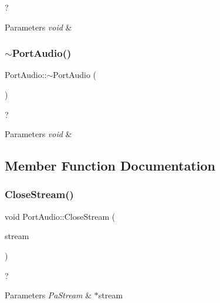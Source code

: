 ? 


\begin{DoxyParams}{Parameters}
{\em void} & \\
\hline
\end{DoxyParams}
\mbox{\label{class_port_audio_a5f80fdff2377981fcd42fae42d4b65c3}} 
\subsubsection{\texorpdfstring{$\sim$\+Port\+Audio()}{~PortAudio()}}
{\footnotesize\ttfamily Port\+Audio\+::$\sim$\+Port\+Audio (\begin{DoxyParamCaption}{ }\end{DoxyParamCaption})}



? 


\begin{DoxyParams}{Parameters}
{\em void} & \\
\hline
\end{DoxyParams}


\subsection{Member Function Documentation}
\mbox{\label{class_port_audio_acb0f54f9382bc8da31d2a39bcf88bb36}} 
\subsubsection{\texorpdfstring{Close\+Stream()}{CloseStream()}}
{\footnotesize\ttfamily void Port\+Audio\+::\+Close\+Stream (\begin{DoxyParamCaption}\item[{Pa\+Stream $\ast$}]{stream }\end{DoxyParamCaption})}



? 


\begin{DoxyParams}{Parameters}
{\em Pa\+Stream} & $\ast$stream \\
\hline
\end{DoxyParams}
\mbox{\label{class_port_audio_ac3d84aa081e68ed4b6b32e901a25ea8c}} 
